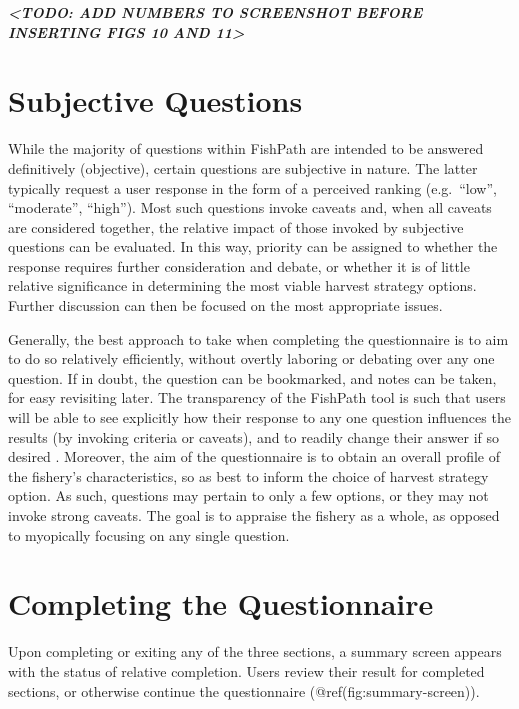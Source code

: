 \documentclass[11pt,]{book}
\begin{document}
\textbf{\emph{\textless TODO: ADD NUMBERS TO SCREENSHOT BEFORE INSERTING
FIGS 10 AND 11\textgreater{}}}

\hypertarget{subjective-questions}{%
\section{Subjective Questions}\label{subjective-questions}}

While the majority of questions within FishPath are intended to be
answered definitively (objective), certain questions are subjective in
nature. The latter typically request a user response in the form of a
perceived ranking (e.g.~``low'', ``moderate'', ``high''). Most such
questions invoke caveats and, when all caveats are considered together,
the relative impact of those invoked by subjective questions can be
evaluated. In this way, priority can be assigned to whether the response
requires further consideration and debate, or whether it is of little
relative significance in determining the most viable harvest strategy
options. Further discussion can then be focused on the most appropriate
issues.

Generally, the best approach to take when completing the questionnaire
is to aim to do so relatively efficiently, without overtly laboring or
debating over any one question. If in doubt, the question can be
bookmarked, and notes can be taken, for easy revisiting later. The
transparency of the FishPath tool is such that users will be able to see
explicitly how their response to any one question influences the results
(by invoking criteria or caveats), and to readily change their answer if
so desired . Moreover, the aim of the questionnaire is to obtain an
overall profile of the fishery's characteristics, so as best to inform
the choice of harvest strategy option. As such, questions may pertain to
only a few options, or they may not invoke strong caveats. The goal is
to appraise the fishery as a whole, as opposed to myopically focusing on
any single question.

\hypertarget{completing-the-questionnaire}{%
\section{Completing the
Questionnaire}\label{completing-the-questionnaire}}

Upon completing or exiting any of the three sections, a summary screen
appears with the status of relative completion. Users review their
result for completed sections, or otherwise continue the questionnaire
(@ref(fig:summary-screen)).
\end{document}
